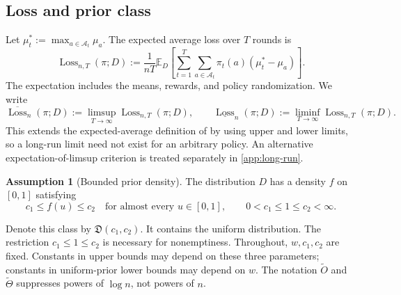 \documentclass[11pt,letterpaper]{article}
\numberwithin{equation}{section}
\theoremstyle{definition}
\newtheorem{assumption}[assumption]{Assumption}
\theoremstyle{remark}
\newcommand{\E}{\mathbb{E}}
\newcommand{\1}{\mathbf{1}}
\newcommand{\A}{\mathcal{A}}
\newcommand{\Loss}{\operatorname{Loss}}
\newcommand{\wtO}{\widetilde{O}}
\newcommand{\wtTheta}{\widetilde{\Theta}}
\begin{document}
\subsection{Loss and prior class}

Let $\mu_t^*:=\max_{a\in\A_t}\mu_a$. The expected average loss over
$T$ rounds is
\begin{equation}\label{eq:finite-loss}
  \Loss_{n,T}(\pi;D)
  :=\frac{1}{nT}\E_D\!\left[
    \sum_{t=1}^{T}\sum_{a\in\A_t}
      \pi_t(a)(\mu_t^*-\mu_a)
  \right].
\end{equation}
The expectation includes the means, rewards, and policy randomization.
We write
\[
  \overline{\Loss}_n(\pi;D)
  :=\limsup_{T\to\infty}\Loss_{n,T}(\pi;D),
  \qquad
  \underline{\Loss}_n(\pi;D)
  :=\liminf_{T\to\infty}\Loss_{n,T}(\pi;D).
\]
This extends the expected-average definition of \citet{jia2023short}
by using upper and lower limits, so a long-run limit need not exist
for an arbitrary policy. An alternative expectation-of-limsup
criterion is treated separately in \cref{app:long-run}.

\begin{assumption}[Bounded prior density]\label{ass:bounded-density}
The distribution $D$ has a density $f$ on $[0,1]$ satisfying
\[
  c_1\le f(u)\le c_2
  \quad\text{for almost every }u\in[0,1],
  \qquad 0<c_1\le1\le c_2<\infty.
\]
\end{assumption}

Denote this class by $\mathfrak D(c_1,c_2)$. It contains the uniform
distribution. The restriction $c_1\le1\le c_2$ is necessary for
nonemptiness. Throughout, $w,c_1,c_2$ are fixed. Constants in upper
bounds may depend on these three parameters; constants in uniform-prior
lower bounds may depend on $w$. The notation $\wtO$ and $\wtTheta$
suppresses powers of $\log n$, not powers of $n$.
\end{document}

